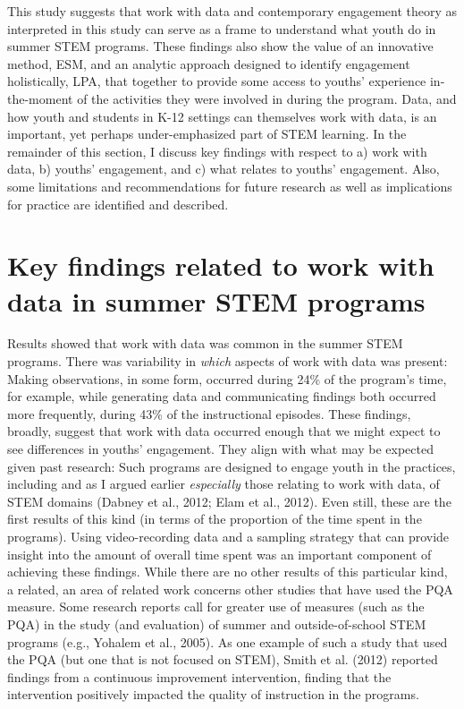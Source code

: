 \documentclass[]{book}
\theoremstyle{definition}
\theoremstyle{definition}
\theoremstyle{definition}
\theoremstyle{remark}
\begin{document}
This study suggests that work with data and contemporary engagement
theory as interpreted in this study can serve as a frame to understand
what youth do in summer STEM programs. These findings also show the
value of an innovative method, ESM, and an analytic approach designed to
identify engagement holistically, LPA, that together to provide some
access to youths' experience in-the-moment of the activities they were
involved in during the program. Data, and how youth and students in K-12
settings can themselves work with data, is an important, yet perhaps
under-emphasized part of STEM learning. In the remainder of this
section, I discuss key findings with respect to a) work with data, b)
youths' engagement, and c) what relates to youths' engagement. Also,
some limitations and recommendations for future research as well as
implications for practice are identified and described.

\section{Key findings related to work with data in summer STEM
programs}\label{key-findings-related-to-work-with-data-in-summer-stem-programs}

Results showed that work with data was common in the summer STEM
programs. There was variability in \emph{which} aspects of work with
data was present: Making observations, in some form, occurred during
24\% of the program's time, for example, while generating data and
communicating findings both occurred more frequently, during 43\% of the
instructional episodes. These findings, broadly, suggest that work with
data occurred enough that we might expect to see differences in youths'
engagement. They align with what may be expected given past research:
Such programs are designed to engage youth in the practices, including
and as I argued earlier \emph{especially} those relating to work with
data, of STEM domains (Dabney et al., 2012; Elam et al., 2012). Even
still, these are the first results of this kind (in terms of the
proportion of the time spent in the programs). Using video-recording
data and a sampling strategy that can provide insight into the amount of
overall time spent was an important component of achieving these
findings. While there are no other results of this particular kind, a
related, an area of related work concerns other studies that have used
the PQA measure. Some research reports call for greater use of measures
(such as the PQA) in the study (and evaluation) of summer and
outside-of-school STEM programs (e.g., Yohalem et al., 2005). As one
example of such a study that used the PQA (but one that is not focused
on STEM), Smith et al. (2012) reported findings from a continuous
improvement intervention, finding that the intervention positively
impacted the quality of instruction in the programs.
\end{document}
